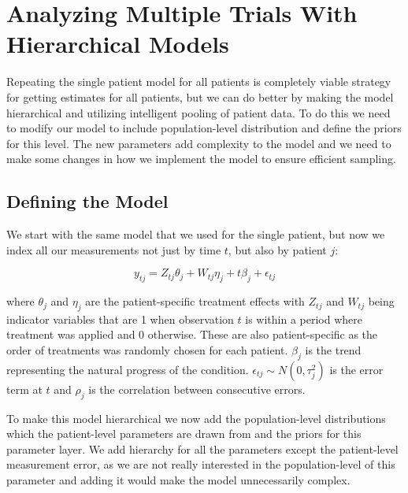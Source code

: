 \documentclass[12pt,a4paper,leqno]{report}
\theoremstyle{plain}
\theoremstyle{definition}
\theoremstyle{remark}
\begin{document}
\section{Analyzing Multiple Trials With Hierarchical Models}\label{pooling}

Repeating the single patient model for all patients is completely viable strategy for
getting estimates for all patients, but we can do better by making the model
hierarchical and utilizing intelligent pooling of patient data. To do this we need to
modify our model to include population-level distribution and define the priors for this
level. The new parameters add complexity to the model and we need to make some changes
in how we implement the model to ensure efficient sampling.

\subsection{Defining the Model}\label{hiermodel}

We start with the same model that we used for the single patient, but now we index all our
measurements not just by time \(t\), but also by patient \(j\):

\begin{def}\label{hierarchicalmodel}
    \begin{equation}\label{}
        y_{tj} = Z_{tj}\theta_{j} + W_{tj}\eta_{j} + t\beta_{j} + \epsilon_{tj}
    \end{equation}
\end{def} where \(\theta_{j} \) and \(\eta_{j} \) are the patient-specific treatment
effects with \(Z_{tj}\) and \(W_{tj}\) being indicator
variables that are 1 when observation \(t\) is within a period where treatment was applied and
0 otherwise. These are also patient-specific as the order of treatments was randomly
chosen for each patient. \(\beta_j\) is the trend representing the natural progress of the
condition. \(\epsilon_{tj} \sim N(0,\tau_j^2) \) is the error term at \(t\) and
\(\rho_j\) is the correlation between consecutive errors.

To make this model hierarchical we now add the population-level distributions which
the patient-level parameters are drawn from and the priors for this parameter layer.
We add hierarchy for all the parameters except the patient-level measurement error, as
we are not really interested in the population-level of this parameter and adding it
would make the model unnecessarily complex.
\end{document}
